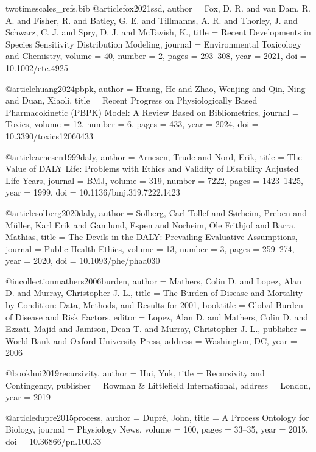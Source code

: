 \begin{filecontents*}{twotimescales_refs.bib}
@article{fox2021ssd,
  author  = {Fox, D. R. and van Dam, R. A. and Fisher, R. and Batley, G. E. and Tillmanns, A. R. and Thorley, J. and Schwarz, C. J. and Spry, D. J. and McTavish, K.},
  title   = {Recent Developments in Species Sensitivity Distribution Modeling},
  journal = {Environmental Toxicology and Chemistry},
  volume  = {40},
  number  = {2},
  pages   = {293--308},
  year    = {2021},
  doi     = {10.1002/etc.4925}
}

@article{huang2024pbpk,
  author  = {Huang, He and Zhao, Wenjing and Qin, Ning and Duan, Xiaoli},
  title   = {Recent Progress on Physiologically Based Pharmacokinetic (PBPK) Model: A Review Based on Bibliometrics},
  journal = {Toxics},
  volume  = {12},
  number  = {6},
  pages   = {433},
  year    = {2024},
  doi     = {10.3390/toxics12060433}
}

@article{arnesen1999daly,
  author  = {Arnesen, Trude and Nord, Erik},
  title   = {The Value of DALY Life: Problems with Ethics and Validity of Disability Adjusted Life Years},
  journal = {BMJ},
  volume  = {319},
  number  = {7222},
  pages   = {1423--1425},
  year    = {1999},
  doi     = {10.1136/bmj.319.7222.1423}
}

@article{solberg2020daly,
  author  = {Solberg, Carl Tollef and S{\o}rheim, Preben and M{\"u}ller, Karl Erik and Gamlund, Espen and Norheim, Ole Frithjof and Barra, Mathias},
  title   = {The Devils in the DALY: Prevailing Evaluative Assumptions},
  journal = {Public Health Ethics},
  volume  = {13},
  number  = {3},
  pages   = {259--274},
  year    = {2020},
  doi     = {10.1093/phe/phaa030}
}

@incollection{mathers2006burden,
  author    = {Mathers, Colin D. and Lopez, Alan D. and Murray, Christopher J. L.},
  title     = {The Burden of Disease and Mortality by Condition: Data, Methods, and Results for 2001},
  booktitle = {Global Burden of Disease and Risk Factors},
  editor    = {Lopez, Alan D. and Mathers, Colin D. and Ezzati, Majid and Jamison, Dean T. and Murray, Christopher J. L.},
  publisher = {World Bank and Oxford University Press},
  address   = {Washington, DC},
  year      = {2006}
}

@book{hui2019recursivity,
  author    = {Hui, Yuk},
  title     = {Recursivity and Contingency},
  publisher = {Rowman \& Littlefield International},
  address   = {London},
  year      = {2019}
}

@article{dupre2015process,
  author  = {Dupr{\'e}, John},
  title   = {A Process Ontology for Biology},
  journal = {Physiology News},
  volume  = {100},
  pages   = {33--35},
  year    = {2015},
  doi     = {10.36866/pn.100.33}
}
\end{filecontents*}

